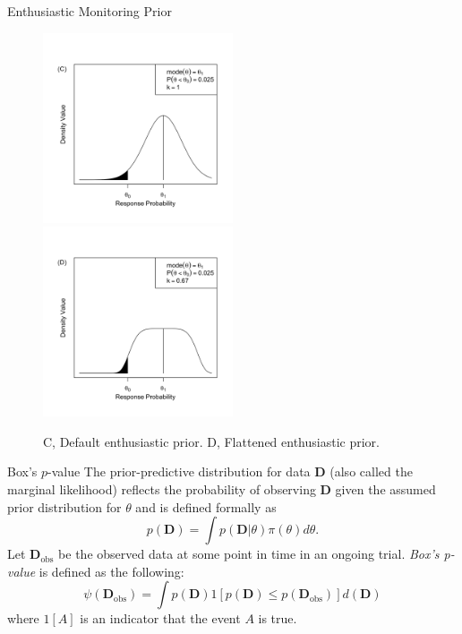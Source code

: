 \documentclass{beamer}
\begin{document}
\begin{frame}{Enthusiastic Monitoring Prior}
\begin{figure}[htbp]
\begin{center}
\includegraphics[width=0.5\textwidth]{./figures/figure1c.png}%
\includegraphics[width=0.5\textwidth]{./figures/figure1d.png}
\caption{C, Default enthusiastic prior. D, Flattened enthusiastic prior.}

\label{fig:figure1}
\end{center}
\end{figure}
\end{frame}

\begin{frame}{Box's $p$-value}
The prior-predictive distribution for data $\mathbf{D}$ (also called the marginal likelihood) reflects the probability of observing $\mathbf{D}$ given 
the assumed prior distribution for $\theta$ and is defined formally as
\begin{equation}\label{eq:pred_dist}
p(\mathbf{D}) =\int p(\mathbf{D}|\theta)\pi(\theta)d\theta.
\end{equation}
Let $\mathbf{D}_{\text{obs}}$ be the observed data at some point in time in an ongoing trial. 
\textit{Box's p-value} is defined as the following:
\begin{equation}\label{eq:box_p}
\psi({\mathbf{D}_{\text{obs}}})=\int {p(\mathbf{D})}  1[p(\mathbf{D})\leq p(\mathbf{D}_{\text{obs}})] d(\mathbf{D})
\end{equation}
%
where $1[A]$ is an indicator that the event $A$ is true.
\end{frame}
\end{document}
